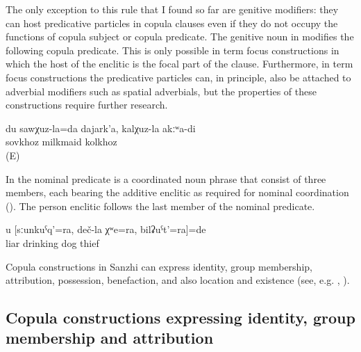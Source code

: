 The only exception to this rule that I found so far are genitive modifiers: they can host predicative particles in copula clauses even if they do not occupy the functions of copula subject or copula predicate. The genitive noun in  modifies the following copula predicate. This is only possible in term focus constructions in which the host of the enclitic is the focal part of the clause. Furthermore, in term focus constructions the predicative particles can, in principle, also be attached to adverbial modifiers such as spatial adverbials, but the properties of these constructions require further research.
%
\begin{exe}
	\ex	\label{ex:‎I am milkmaid of the SOVKHOZ, not of the kolkhoz}
	\gll	du	sawχuz-la=da	dajark'a,	kalχuz-la	akːʷa-di\\
			sovkhoz	milkmaid	kolkhoz	\\
	\glt	{} (E)
\end{exe}

In  the nominal predicate is a coordinated noun phrase that consist of three members, each bearing the additive enclitic as required for nominal coordination (). The person enclitic follows the last member of the nominal predicate.
%
\begin{exe}
	\ex	\label{ex:You are a liar, a drinking dog, and a thief}
	\gll	u	[sːunkuˁq'=ra,	deč-la	χʷe=ra,	bilʡuˁt'=ra]=de\\
			liar	drinking	dog	thief\\
	\glt	{}
\end{exe}

Copula constructions in Sanzhi can express identity, group membership, attribution, possession, benefaction, and also location and existence (see, e.g. \citealp{Curnow2000}, \citealp[159]{Dixon2010}). 

\subsection{Copula constructions expressing identity, group membership and attribution}
\label{ssec:Copula constructions expressing identity, group membership and attribution}

